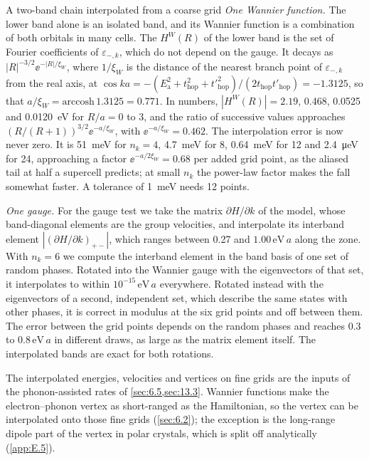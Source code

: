 \begin{workedexample}{A two-band chain interpolated from a coarse grid}
\emph{One Wannier function.} The lower band alone is an isolated band, and its Wannier function is a combination of both orbitals in many cells. The $H^W(R)$ of the lower band is the set of Fourier coefficients of $\varepsilon_{-,k}$, which do not depend on the gauge. It decays as $|R|^{-3/2}\ee^{-|R|/\xi_W}$, where $1/\xi_W$ is the distance of the nearest branch point of $\varepsilon_{-,k}$ from the real axis, at $\cos ka = -(E_{\mathrm{a}}^2 + t_{\mathrm{hop}}^2 + t'^2_{\mathrm{hop}})/(2t_{\mathrm{hop}}t'_{\mathrm{hop}}) = -1.3125$, so that $a/\xi_W = \mathrm{arccosh}\,1.3125 = 0.771$. In numbers, $|H^W(R)| = 2.19$, 0.468, 0.0525 and \SI{0.0120}{eV} for $R/a = 0$ to 3, and the ratio of successive values approaches $(R/(R+1))^{3/2}\ee^{-a/\xi_W}$, with $\ee^{-a/\xi_W} = 0.462$. The interpolation error is now never zero. It is \SI{51}{meV} for $n_k = 4$, \SI{4.7}{meV} for 8, \SI{0.64}{meV} for 12 and \SI{2.4}{\micro eV} for 24, approaching a factor $\ee^{-a/2\xi_W} = 0.68$ per added grid point, as the aliased tail at half a supercell predicts; at small $n_k$ the power-law factor makes the fall somewhat faster. A tolerance of \SI{1}{meV} needs 12 points.

\emph{One gauge.} For the gauge test we take the matrix $\partial H/\partial k$ of the model, whose band-diagonal elements are the group velocities, and interpolate its interband element $|(\partial H/\partial k)_{+-}|$, which ranges between 0.27 and $1.00\,\mathrm{eV}\,a$ along the zone. With $n_k = 6$ we compute the interband element in the band basis of one set of random phases. Rotated into the Wannier gauge with the eigenvectors of that set, it interpolates to within $10^{-15}\,\mathrm{eV}\,a$ everywhere. Rotated instead with the eigenvectors of a second, independent set, which describe the same states with other phases, it is correct in modulus at the six grid points and off between them. The error between the grid points depends on the random phases and reaches 0.3 to $0.8\,\mathrm{eV}\,a$ in different draws, as large as the matrix element itself. The interpolated bands are exact for both rotations.
\end{workedexample}

The interpolated energies, velocities and vertices on fine grids are the inputs of the phonon-assisted rates of \cref{sec:6.5,sec:13.3}. Wannier functions make the electron--phonon vertex as short-ranged as the Hamiltonian, so the vertex can be interpolated onto those fine grids (\cref{sec:6.2}); the exception is the long-range dipole part of the vertex in polar crystals, which is split off analytically (\cref{app:E.5}).
